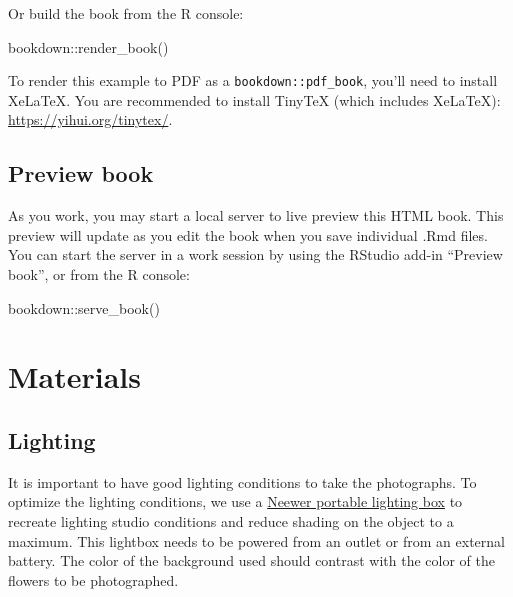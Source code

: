 \documentclass[
]{book}
\newenvironment{Shaded}{\begin{snugshade}}{\end{snugshade}}
\newcommand{\FunctionTok}[1]{\textcolor[rgb]{0.00,0.00,0.00}{#1}}
\newcommand{\NormalTok}[1]{#1}
\newcommand{\SpecialCharTok}[1]{\textcolor[rgb]{0.00,0.00,0.00}{#1}}
\theoremstyle{definition}
\theoremstyle{definition}
\theoremstyle{definition}
\theoremstyle{definition}
\theoremstyle{remark}
\begin{document}
Or build the book from the R console:

\begin{Shaded}
\begin{Highlighting}[]
\NormalTok{bookdown}\SpecialCharTok{::}\FunctionTok{render\_book}\NormalTok{()}
\end{Highlighting}
\end{Shaded}

To render this example to PDF as a \texttt{bookdown::pdf\_book}, you'll need to install XeLaTeX. You are recommended to install TinyTeX (which includes XeLaTeX): \url{https://yihui.org/tinytex/}.

\hypertarget{preview-book}{%
\section{Preview book}\label{preview-book}}

As you work, you may start a local server to live preview this HTML book. This preview will update as you edit the book when you save individual .Rmd files. You can start the server in a work session by using the RStudio add-in ``Preview book'', or from the R console:

\begin{Shaded}
\begin{Highlighting}[]
\NormalTok{bookdown}\SpecialCharTok{::}\FunctionTok{serve\_book}\NormalTok{()}
\end{Highlighting}
\end{Shaded}

\hypertarget{materials}{%
\chapter{Materials}\label{materials}}

\hypertarget{lighting}{%
\section{Lighting}\label{lighting}}

It is important to have good lighting conditions to take the
photographs. To optimize the lighting conditions, we use a \href{https://neewer.com/collections/shooting-tent}{Neewer
portable lighting box} to
recreate lighting studio conditions and reduce shading on the object to
a maximum. This lightbox needs to be powered from an outlet or from an
external battery. The color of the background used should contrast with
the color of the flowers to be photographed.
\end{document}
